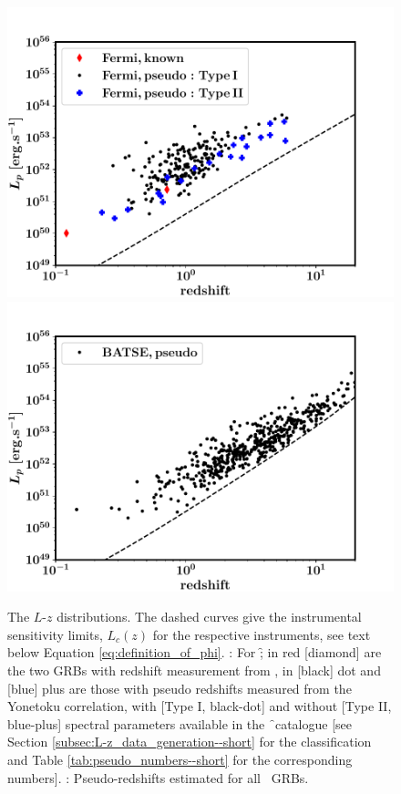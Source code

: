 \begin{figure}
\begin{center}
\includegraphics[scale=0.42]{L_vs_z--Fermi_short_all}
\includegraphics[scale=0.42]{L_vs_z--BATSE_short_all}
\caption[Luminosity versus redshift of all short GRBs]{The $L$-$z$ distributions. The dashed curves give the instrumental sensitivity limits, $L_c (z)$ for the respective instruments, see text below Equation \ref{eq:definition_of_phi}. \eL: For \f; in red [diamond] are the two GRBs with redshift measurement from \s, in [black] dot and [blue] plus are those with pseudo redshifts measured from the Yonetoku correlation, with [Type I, black-dot] and without [Type II, blue-plus] spectral parameters available in the \f\ catalogue [see Section \ref{subsec:L-z_data_generation--short} for the classification and Table \ref{tab:pseudo_numbers--short} for the corresponding numbers]. \eR: Pseudo-redshifts estimated for all \B\ GRBs.}
\label{fig:L-z--short}
\end{center}
\end{figure}



